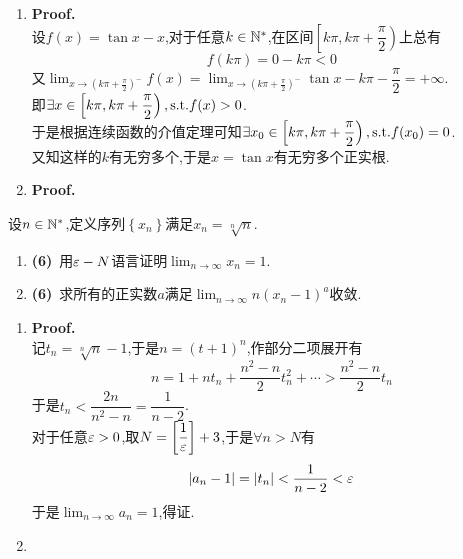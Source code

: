 \documentclass{ctexart}
\begin{document}
\begin{solution}
    \begin{enumerate}[label=\textbf{(\arabic*)}]
        \item \textbf{Proof.}\\
            设$f(x)=\tan x-x$,对于任意$k\in\mathbb{N}^*$,在区间$\left[k\pi,k\pi+\dfrac{\pi}{2}\right)$上总有
            $$f(k\pi)=0-k\pi<0$$
            又$\displaystyle\lim_{x\to\left(k\pi+\frac{\pi}{2}\right)^-}f(x)=\lim_{x\to\left(k\pi+\frac{\pi}{2}\right)^-}\tan x-k\pi-\dfrac{\pi}{2}=+\infty$.\\
            即$\exists x\in\left[k\pi,k\pi+\dfrac{\pi}{2}\right),\text{s.t.} f(x)>0$.\\
            于是根据连续函数的介值定理可知$\exists x_0\in\left[k\pi,k\pi+\dfrac{\pi}{2}\right),\text{s.t.} f(x_0)=0$.\\
            又知这样的$k$有无穷多个,于是$x=\tan x$有无穷多个正实根.
        \item \textbf{Proof.}\\
    \end{enumerate}
\end{solution}
\begin{problem}[8.(12\songti{分})]
    设$n\in\mathbb{N}^*$,定义序列$\left\{x_n\right\}$满足$x_n=\sqrt[n]{n}$.
    \begin{enumerate}[label=\textbf{(\arabic*)}]
        \item \textbf{(6)}\ 用$\varepsilon-N$语言证明$\displaystyle\lim_{n\to\infty}x_n=1$.
        \item \textbf{(6)}\ 求所有的正实数$a$满足$\displaystyle\lim_{n\to\infty}n(x_n-1)^a$收敛.
    \end{enumerate}
\end{problem}
\begin{solution}
    \begin{enumerate}[label=\textbf{(\arabic*)}]
        \item \textbf{Proof.}\\
            记$t_n=\sqrt[n]{n}-1$,于是$n=\left(t+1\right)^n$,作部分二项展开有
            $$n=1+nt_n+\dfrac{n^2-n}{2}t_n^2+\cdots>\dfrac{n^2-n}{2}t_n$$
            于是$t_n<\dfrac{2n}{n^2-n}=\dfrac{1}{n-2}$.\\
            对于任意$\varepsilon>0$,取$N=\left[\dfrac{1}{\varepsilon}\right]+3$,于是$\forall n>N$有
            $$\left|a_n-1\right|=\left|t_n\right|<\dfrac{1}{n-2}<\varepsilon$$
            于是$\displaystyle\lim_{n\to\infty}a_n=1$,得证.
        \item 
    \end{enumerate}
\end{solution}
\end{document}
